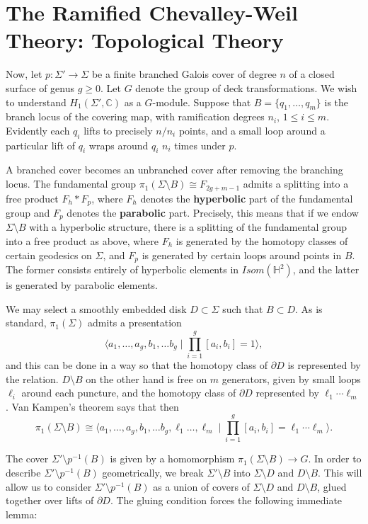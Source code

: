 \documentclass[11pt]{amsart}
\numberwithin{thm}{section}
\begin{document}
\section{The Ramified Chevalley-Weil Theory: Topological Theory}\label{s:ramcw}
Now, let $p:\Sigma'\to\Sigma$ be a finite branched Galois cover of degree $n$ of a closed surface of genus $g\geq 0$.  Let $G$ denote the group of deck transformations.  We wish to understand $H_1(\Sigma',{\mathbb{C}})$ as a $G$-module.  Suppose that $B=\{q_1,\ldots, q_m\}$ is the branch locus of the covering map, with ramification degrees $n_i$, $1\leq i\leq m$.  Evidently each $q_i$ lifts to precisely $n/n_i$ points, and a small loop around a particular lift of $q_i$ wraps around $q_i$ $n_i$ times under $p$.

A branched cover becomes an unbranched cover after removing the branching locus.  The fundamental group $\pi_1(\Sigma\setminus B)\cong F_{2g+m-1}$ admits a splitting into a free product $F_h*F_p$, where $F_h$ denotes the {\bf hyperbolic} part of the fundamental group and $F_p$ denotes the {\bf parabolic} part.  Precisely, this means that if we endow $\Sigma\setminus B$ with a hyperbolic structure, there is a splitting of the fundamental group into a free product as above, where $F_h$ is generated by the homotopy classes of certain geodesics on $\Sigma$, and $F_p$ is generated by certain loops around points in $B$.  The former consists entirely of hyperbolic elements in $Isom({\mathbb{H}}^2)$, and the latter is generated by parabolic elements.

We may select a smoothly embedded disk $D\subset \Sigma$ such that $B\subset D$.  As is standard, $\pi_1(\Sigma)$ admits a presentation \[\langle a_1,\ldots, a_g,b_1,\ldots b_g\mid\prod_{i=1}^g [a_i,b_i]=1\rangle,\] and this can be done in a way so that the homotopy class of $\partial D$ is represented by the relation.  $D\setminus B$ on the other hand is free on $m$ generators, given by small loops $\ell_i$ around each puncture, and the homotopy class of $\partial D$ represented by $\ell_1\cdots\ell_m$.  Van Kampen's theorem says that then \[\pi_1(\Sigma\setminus B)\cong\langle a_1,\ldots, a_g,b_1,\ldots b_g, \ell_1\ldots,\ell_m\mid\prod_{i=1}^g [a_i,b_i]=\ell_1\cdots\ell_m\rangle.\]

The cover $\Sigma'\setminus p^{-1}(B)$ is given by a homomorphism $\pi_1(\Sigma\setminus B)\to G$.  In order to describe $\Sigma'\setminus p^{-1}(B)$ geometrically, we break $\Sigma'\setminus B$ into $\Sigma\setminus D$ and $D\setminus B$.  This will allow us to consider $\Sigma'\setminus p^{-1}(B)$ as a union of covers of $\Sigma\setminus D$ and $D\setminus B$, glued together over lifts of $\partial D$.  The gluing condition forces the following immediate lemma:
\end{document}
